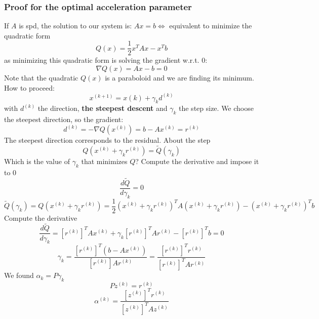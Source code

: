     \subsubsection{Proof for the optimal acceleration parameter}
    If $A$ is spd, the solution to our system is: $Ax=b\Leftrightarrow$ equivalent to minimize the quadratic form
    $$Q(x)=\frac{1}{2}x^TAx-x^Tb$$
    as minimizing this quadratic form is solving the gradient w.r.t. 0:
    $$
    \nabla Q(x)=Ax-b=0
    $$
    Note that the quadratic $Q(x)$ is a paraboloid and we are finding its minimum. How to proceed:
    $$
    x^{(k+1)}=x{(k)}+\gamma_kd^{(k)}
    $$
    with $d^{(k)}$ the direction, \textbf{the steepest descent} and $\gamma_k$ the step size. We choose the steepest direction, so the gradient:
    $$
    d^{(k)}=-\nabla Q(x^{(k)})=b-Ax^{(k)}=r^{(k)}
    $$
    The steepest direction corresponds to the residual. About the step
    $$
    Q\left(
        x^{(k)}+\gamma_kr^{(k)}
    \right)=\tilde{Q}(\gamma_k)
    $$
    Which is the value of $\gamma_k$ that minimizes $Q$? Compute the derivative and impose it to 0
    $$
    \frac{
        d\tilde{Q}
    }{
        d\gamma_k
    }=0
    $$
    $$
    \tilde{Q}(\gamma_k)=Q\left(
        x^{(k)}+\gamma_kr^{(k)}
    \right)=\frac{1}{2}
    \left(
        x^{(k)}+\gamma_kr^{(k)}
    \right)^TA
    \left(
        x^{(k)}+\gamma_kr^{(k)}
    \right)-
    \left(
        x^{(k)}+\gamma_kr^{(k)}
    \right)^Tb
    $$
    Compute the derivative
    $$
    \frac{
        d\tilde{Q}
    }{
        d\gamma_k
    }=
    \left[r^{(k)}\right]^TAx^{(k)}+
    \gamma_k\left[r^{(k)}\right]^TAr^{(k)}-
    \left[r^{(k)}\right]^Tb
    =0
    $$
    $$
    \gamma_k=
    \frac{
        \left[r^{(k)}\right]^T\left(b-Ax^{(k)}\right)
    }{
        \left[r^{(k)}\right]Ar^{(k)}
    }=
    \frac{
        \left[r^{(k)}\right]^Tr^{(k)}
    }{
        \left[r^{(k)}\right]^TAr^{(k)}
    }
    $$
    We found $\alpha_k=P\gamma_k$
    $$
    Pz^{(k)}=r^{(k)}
    $$
    $$
    \alpha^{(k)}=\frac{
        \left[z^{(k)}\right]^Tr^{(k)}
    }{
        \left[z^{(k)}\right]^TAz^{(k)}
    }
    $$

